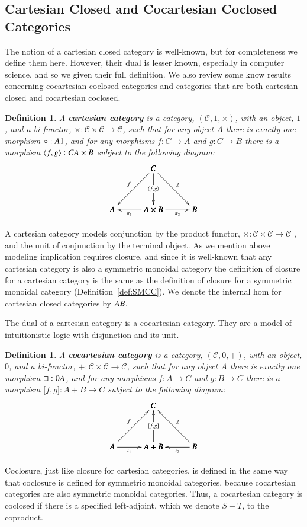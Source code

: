 \documentclass{lmcs}
\newtheorem{definition}[theorem]{Definition}
\let\mto\to
\let\to\relax
\newcommand{\to}{\rightarrow}
\newcommand{\cat}[1]{\mathcal{#1}}
\begin{document}
\subsection{Cartesian Closed and Cocartesian Coclosed Categories}
\label{subsec:cartesian_closed_and_cocartesian_coclosed_categories}
The notion of a cartesian closed category is well-known, but for
completeness we define them here.  However, their dual is lesser
known, especially in computer science, and so we given their full
definition.  We also review some know results concerning cocartesian
coclosed categories and categories that are both cartesian closed and
cocartesian coclosed.
\begin{definition}
  \label{def:CC}
  A \textbf{cartesian category} is a category, $(\cat{C}, 1, \times)$,
  with an object, $1$, and a bi-functor, $\times : \cat{C} \times
  \cat{C} \mto \cat{C}$, such that for any object $A$ there is exactly
  one morphism $\diamond : A \to 1$, and for any morphisms $f : C \mto
  A$ and $g : C \mto B$ there is a morphism $\langle f , g \rangle : C
  \to A \times B$ subject to the following diagram:
  \[
  \bfig
  \Atrianglepair/->`->`->`<-`->/[C`A`A\times B`B;
    f`
    \langle f , g \rangle`
    g`
    \pi_1`
    \pi_2]
  \efig
  \]
\end{definition}
A cartesian category models conjunction by the product functor,
$\times : \cat{C} \times \cat{C} \mto \cat{C}$ , and the unit of
conjunction by the terminal object.  As we mention above modeling
implication requires closure, and since it is well-known that any
cartesian category is also a symmetric monoidal category the
definition of closure for a cartesian category is the same as the
definition of closure for a symmetric monoidal category
(Definition~\ref{def:SMCC}).  We denote the internal hom for cartesian
closed categories by $A \to B$.

The dual of a cartesian category is a cocartesian category.  They are
a model of intuitionistic logic with disjunction and its unit.
\begin{definition}
  \label{def:coCC}
  A \textbf{cocartesian category} is a category, $(\cat{C}, 0, +)$,
  with an object, $0$, and a bi-functor,
  $+ : \cat{C} \times \cat{C} \mto \cat{C}$, such that for any object $A$ there is exactly
  one morphism $\Box : 0 \to A$, and for any morphisms $f : A \mto C$ and $g : B \mto C$
  there is a morphism $\lbrack f , g \rbrack : A + B \mto C$
  subject to the following diagram:
  \[
  \bfig
  \Atrianglepair/<-`<-`<-`->`<-/[C`A`A+B`B;
    f`
    \lbrack f, g \rbrack`
    g`
    \iota_1`
    \iota_2]
  \efig
  \]  
\end{definition}
Coclosure, just like closure for cartesian categories, is defined in
the same way that coclosure is defined for symmetric monoidal
categories, because cocartesian categories are also symmetric
monoidal categories.  Thus, a cocartesian category is coclosed if
there is a specified left-adjoint, which we denote $S - T$, to the
coproduct.
\end{document}
